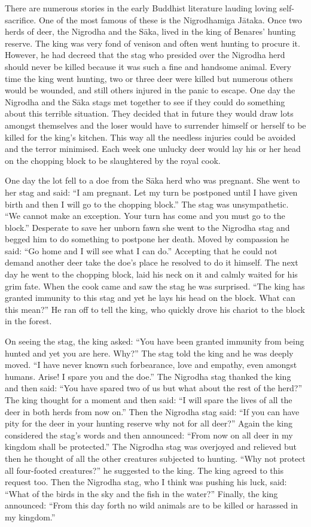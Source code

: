 \documentclass[10pt, openright]{book}
\begin{document}
There are numerous stories in the early Buddhist literature lauding loving self-sacrifice. One of the most famous of these is the Nigrodhamiga Jātaka. Once two herds of deer, the Nigrodha and the Sāka, lived in the king of Benares’ hunting reserve. The king was very fond of venison and often went hunting to procure it. However, he had decreed that the stag who presided over the Nigrodha herd should never be killed because it was such a fine and handsome animal. Every time the king went hunting, two or three deer were killed but numerous others would be wounded, and still others injured in the panic to escape. One day the Nigrodha and the Sāka stags met together to see if they could do something about this terrible situation. They decided that in future they would draw lots amongst themselves and the loser would have to surrender himself or herself to be killed for the king’s kitchen. This way all the needless injuries could be avoided and the terror minimised. Each week one unlucky deer would lay his or her head on the chopping block to be slaughtered by the royal cook.


One day the lot fell to a doe from the Sāka herd who was pregnant. She went to her stag and said: “I am pregnant. Let my turn be postponed until I have given birth and then I will go to the chopping block.” The stag was unsympathetic. “We cannot make an exception. Your turn has come and you must go to the block.” Desperate to save her unborn fawn she went to the Nigrodha stag and begged him to do something to postpone her death. Moved by compassion he said: “Go home and I will see what I can do.” Accepting that he could not demand another deer take the doe’s place he resolved to do it himself. The next day he went to the chopping block, laid his neck on it and calmly waited for his grim fate. When the cook came and saw the stag he was surprised. “The king has granted immunity to this stag and yet he lays his head on the block. What can this mean?” He ran off to tell the king, who quickly drove his chariot to the block in the forest.


On seeing the stag, the king asked: “You have been granted immunity from being hunted and yet you are here. Why?” The stag told the king and he was deeply moved. “I have never known such forbearance, love and empathy, even amongst humans. Arise! I spare you and the doe.” The Nigrodha stag thanked the king and then said: “You have spared two of us but what about the rest of the herd?” The king thought for a moment and then said: “I will spare the lives of all the deer in both herds from now on.” Then the Nigrodha stag said: “If you can have pity for the deer in your hunting reserve why not for all deer?” Again the king considered the stag’s words and then announced: “From now on all deer in my kingdom shall be protected.” The Nigrodha stag was overjoyed and relieved but then he thought of all the other creatures subjected to hunting. “Why not protect all four-footed creatures?” he suggested to the king. The king agreed to this request too. Then the Nigrodha stag, who I think was pushing his luck, said: “What of the birds in the sky and the fish in the water?” Finally, the king announced: “From this day forth no wild animals are to be killed or harassed in my kingdom.”
\end{document}
